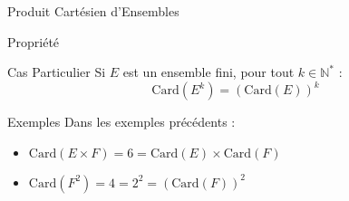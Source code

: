 \documentclass{cours}
\begin{document}
\begin{Gpartie}{Produit Cartésien d'Ensembles}
\begin{Spartie}{Propriété}
\begin{SSpartie}{Cas Particulier}
                Si $E$ est un ensemble fini, pour tout $k\in\mathbb{N^*}$ :
                \[\text{Card}(E^k)=(\text{Card}(E))^k\]
            \end{SSpartie}
            \begin{SSpartie}{Exemples}
                Dans les exemples précédents :
                \begin{itemize}
                    \item $\text{Card}(E\times F)=6=\text{Card}(E)\times\text{Card}(F)$
                    \item $\text{Card}(F^2)=4=2^2=(\text{Card}(F))^2$
                \end{itemize}
            \end{SSpartie}
        \end{Spartie}
    \end{Gpartie}
\end{document}
